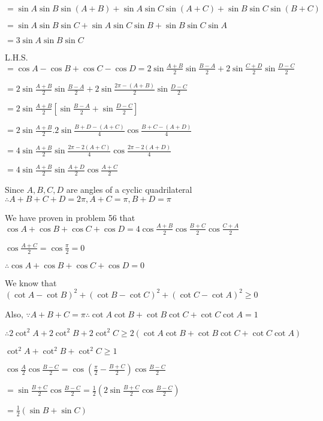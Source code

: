   $= \sin A\sin B\sin(A + B) + \sin A\sin C\sin(A + C) + \sin B\sin C\sin(B + C)$

  $= \sin A\sin B\sin C + \sin A\sin C\sin B + \sin B\sin C\sin A$

  $= 3\sin A\sin B\sin C$

\item L.H.S. $= \cos A - \cos B + \cos C - \cos D = 2\sin\frac{A + B}{2}\sin\frac{B - A}{2} + 2\sin\frac{C + D}{2}\sin\frac{D -
  C}{2}$

  $= 2\sin\frac{A + B}{2}\sin\frac{B - A}{2} + 2\sin\frac{2\pi - (A + B)}{2}\sin\frac{D - C}{2}$

  $= 2\sin\frac{A + B}{2}\left[\sin\frac{B - A}{2} + \sin\frac{D - C}{2}\right]$

  $= 2\sin\frac{A + B}{2}.2\sin\frac{B + D - (A + C)}{4}\cos\frac{B + C - (A + D)}{4}$

  $= 4\sin\frac{A + B}{2}\sin\frac{2\pi - 2(A + C)}{4}\cos\frac{2\pi - 2(A + D)}{4}$

  $= 4\sin\frac{A + B}{2}\sin\frac{A + D}{2}\cos \frac{A + C}{2}$

\item Since $A, B, C, D$ are angles of a cyclic quadrilateral $\therefore A + B + C + D = 2\pi, A + C = \pi, B + D = \pi$

  We have proven in problem 56 that $\cos A + \cos B + \cos C + \cos D = 4\cos\frac{A + B}{2}\cos\frac{B +
    C}{2}\cos\frac{C + A}{2}$

  $\cos\frac{A + C}{2} = \cos\frac{\pi}{2} = 0$

  $\therefore \cos A + \cos B + \cos C + \cos D = 0$

\item We know that $(\cot A - \cot B)^2 + (\cot B - \cot C)^2 + (\cot C - \cot A)^2 \geq 0$

  Also, $\because A + B + C = \pi \therefore \cot A\cot B + \cot B\cot C + \cot C\cot A = 1$

  $\therefore 2\cot^2A + 2\cot^2B + 2\cot^2C \geq 2(\cot A\cot B + \cot B\cot C + \cot C\cot A)$

  $\cot^2A + \cot^2B + \cot^2C \geq 1$

\item $\cos\frac{A}{2}\cos\frac{B - C}{2} = \cos\left(\frac{\pi}{2} - \frac{B + C}{2}\right)\cos\frac{B - C}{2}$

  $= \sin\frac{B + C}{2}\cos\frac{B - C}{2} = \frac{1}{2}\left(2\sin\frac{B + C}{2}\cos\frac{B - C}{2}\right)$

  $= \frac{1}{2}(\sin B + \sin C)$

